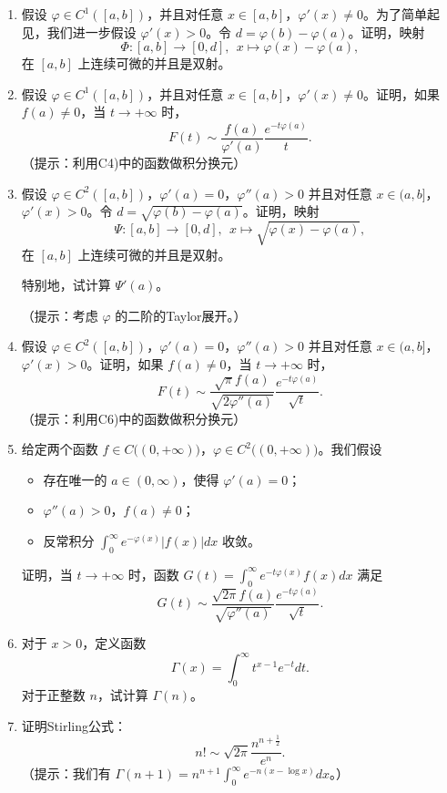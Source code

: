 \begin{enumerate}[label=C\arabic*)]
\item 假设 $\varphi \in C^1([a,b])$，并且对任意 $x\in [a,b]$，$\varphi'(x)\neq 0$。为了简单起见，我们进一步假设 $\varphi'(x)> 0$。令 $d=\varphi(b)-\varphi(a)$。证明，映射
\[\Phi\colon [a,b]\rightarrow [0,d], \ \ x\mapsto \varphi(x)-\varphi(a),\]
在 $[a,b]$ 上连续可微的并且是双射。

\item 假设 $\varphi \in C^1([a,b])$，并且对任意 $x\in [a,b]$，$\varphi'(x)\neq 0$。证明，如果 $f(a)\neq 0$，当 $t\rightarrow +\infty$ 时，
\[F(t)\sim\frac{f(a)}{\varphi'(a)}\frac{e^{-t\varphi(a)}}{t}.\]
（提示：利用C4)中的函数做积分换元）

\item 假设 $\varphi \in C^2([a,b])$，$\varphi'(a)=0$，$\varphi''(a)>0$ 并且对任意 $x\in (a,b]$，$\varphi'(x)>0$。令 $d=\sqrt{\varphi(b)-\varphi(a)}$。证明，映射
\[\Psi\colon [a,b]\rightarrow [0,d], \ \ x\mapsto \sqrt{\varphi(x)-\varphi(a)},\]
在 $[a,b]$ 上连续可微的并且是双射。

特别地，试计算 $\Psi'(a)$。

（提示：考虑 $\varphi$ 的二阶的Taylor展开。）

\item 假设 $\varphi \in C^2([a,b])$，$\varphi'(a)=0$，$\varphi''(a)>0$ 并且对任意 $x\in (a,b]$，$\varphi'(x)>0$。证明，如果 $f(a)\neq 0$，当 $t\rightarrow +\infty$ 时，
\[F(t)\sim \frac{\sqrt{\pi} f(a)}{\sqrt{2\varphi''(a)}}\frac{e^{-t\varphi(a)}}{\sqrt{t}}.\]
（提示：利用C6)中的函数做积分换元）

\item 给定两个函数 $f\in C\bigl((0,+\infty)\bigr)$，$\varphi \in C^2\bigl((0,+\infty)\bigr)$。我们假设
\begin{itemize}
\item 存在唯一的 $a\in (0,\infty)$，使得 $\varphi'(a)=0$；
\item $\varphi''(a)>0$，$f(a)\neq 0$；
\item 反常积分 $\displaystyle \int_{0}^\infty e^{-\varphi(x)}|f(x)|dx$ 收敛。
\end{itemize}
证明，当 $t\rightarrow +\infty$ 时，函数 $\displaystyle G(t)=\int_{0}^\infty e^{-t\varphi(x)}f(x)dx$ 满足
\[G(t)\sim \frac{\sqrt{2\pi} f(a)}{\sqrt{\varphi''(a)}}\frac{e^{-t\varphi(a)}}{\sqrt{t}}.\]
\item 对于 $x>0$，定义函数
\[\Gamma(x)=\int_{0}^\infty t^{x-1}e^{-t}dt.\]
对于正整数 $n$，试计算 $\Gamma(n)$。
\item 证明Stirling公式：
\[n!\sim \sqrt{2\pi}\frac{n^{n+\frac{1}{2}}}{e^n}.\]
（提示：我们有 $\displaystyle \Gamma(n+1)=n^{n+1}\int_0^\infty e^{-n(x-\log x)}dx$。）
\end{enumerate}

